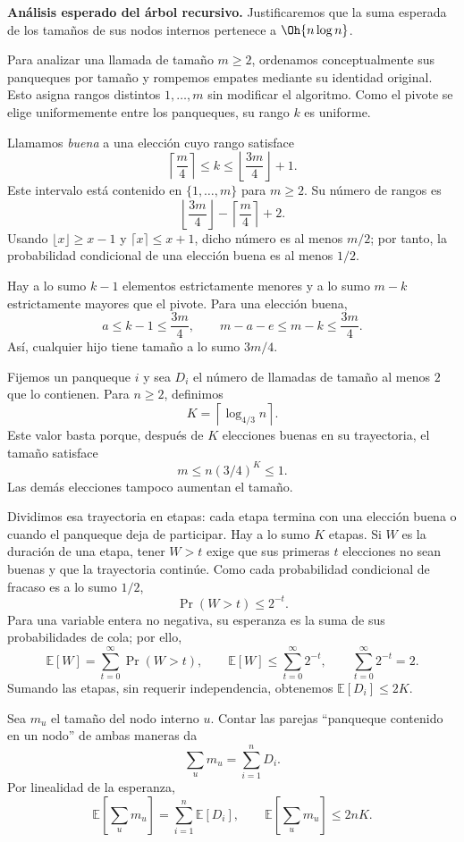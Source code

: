 \textbf{Análisis esperado del árbol recursivo.} Justificaremos que la suma esperada de los tamaños de sus nodos internos pertenece a $\Oh{n\log n}$.

Para analizar una llamada de tamaño $m\ge2$, ordenamos conceptualmente sus panqueques por tamaño y rompemos empates mediante su identidad original. Esto asigna rangos distintos $1,\ldots,m$ sin modificar el algoritmo. Como el pivote se elige uniformemente entre los panqueques, su rango $k$ es uniforme.

Llamamos \emph{buena} a una elección cuyo rango satisface
\[
\left\lceil\frac m4\right\rceil
\le k\le
\left\lfloor\frac{3m}{4}\right\rfloor+1.
\]
Este intervalo está contenido en $\{1,\ldots,m\}$ para $m\ge2$. Su número de rangos es
\[
\left\lfloor\frac{3m}{4}\right\rfloor
-\left\lceil\frac m4\right\rceil+2.
\]
Usando $\lfloor x\rfloor\ge x-1$ y $\lceil x\rceil\le x+1$, dicho número es al menos $m/2$; por tanto, la probabilidad condicional de una elección buena es al menos $1/2$.

Hay a lo sumo $k-1$ elementos estrictamente menores y a lo sumo $m-k$ estrictamente mayores que el pivote. Para una elección buena,
\[
a\le k-1\le\frac{3m}{4},\qquad
m-a-e\le m-k\le\frac{3m}{4}.
\]
Así, cualquier hijo tiene tamaño a lo sumo $3m/4$.

Fijemos un panqueque $i$ y sea $D_i$ el número de llamadas de tamaño al menos $2$ que lo contienen. Para $n\ge2$, definimos
\[
K=\left\lceil\log_{4/3}n\right\rceil.
\]
Este valor basta porque, después de $K$ elecciones buenas en su trayectoria, el tamaño satisface
\[
m\le n(3/4)^K\le1.
\]
Las demás elecciones tampoco aumentan el tamaño.

Dividimos esa trayectoria en etapas: cada etapa termina con una elección buena o cuando el panqueque deja de participar. Hay a lo sumo $K$ etapas. Si $W$ es la duración de una etapa, tener $W>t$ exige que sus primeras $t$ elecciones no sean buenas y que la trayectoria continúe. Como cada probabilidad condicional de fracaso es a lo sumo $1/2$,
\[
\Pr(W>t)\le 2^{-t}.
\]
Para una variable entera no negativa, su esperanza es la suma de sus probabilidades de cola; por ello,
\[
\mathbb E[W]=\sum_{t=0}^{\infty}\Pr(W>t),
\qquad
\mathbb E[W]\le\sum_{t=0}^{\infty}2^{-t},
\qquad
\sum_{t=0}^{\infty}2^{-t}=2.
\]
Sumando las etapas, sin requerir independencia, obtenemos $\mathbb E[D_i]\le2K$.

Sea $m_u$ el tamaño del nodo interno $u$. Contar las parejas ``panqueque contenido en un nodo'' de ambas maneras da
\[
\sum_u m_u=\sum_{i=1}^{n}D_i.
\]
Por linealidad de la esperanza,
\[
\mathbb E\!\left[\sum_u m_u\right]
=\sum_{i=1}^{n}\mathbb E[D_i],
\qquad
\mathbb E\!\left[\sum_u m_u\right]\le2nK.
\]

